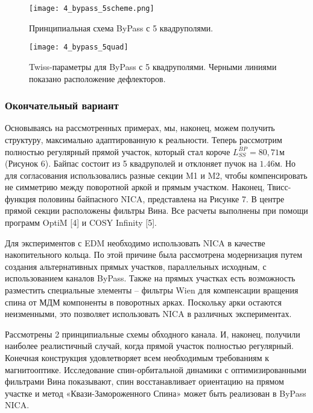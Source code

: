 \begin{figure}[!h]
  \centering
   \texttt{[image: 4\_bypass\_5scheme.png]}
   \caption{Принципиальная схема ByPass с 5 квадруполями.}
   \label{fig:4_bypass_5scheme}
\end{figure}

\begin{figure}[!h]
  \centering
   \texttt{[image: 4\_bypass\_5quad]}
   \caption{Twiss-параметры для ByPass с 5 квадруполями. Черными линиями показано расположение дефлекторов.}
   \label{fig:4_bypass_5quad}
\end{figure}

\subsubsection{Окончательный вариант}\label{sec:EDM/Wien_filter/ByPass/final}

Основываясь на рассмотренных примерах, мы, наконец, можем получить структуру, максимально адаптированную к реальности. Теперь рассмотрим полностью регулярный прямой участок, который стал короче $L_{SS}^{BP}=80,71 м$ (Рисунок 6). Байпас состоит из 5 квадруполей и отклоняет пучок на $1.46 м$. Но для согласования использовались разные секции M1 и M2, чтобы компенсировать не симметрию между поворотной аркой и прямым участком. Наконец, Твисс-функция половины байпасного NICA, представлена на Рисунке 7. В центре прямой секции расположены фильтры Вина. Все расчеты выполнены при помощи программ OptiM [4] и COSY Infinity [5].

\par Для экспериментов с EDM необходимо использовать NICA в качестве накопительного кольца. По этой причине была рассмотрена модернизация путем создания альтернативных прямых участков, параллельных исходным, с использованием каналов ByPass. Также на прямых участках есть возможность разместить специальные элементы – фильтры Wien для компенсации вращения спина от МДМ компоненты в поворотных арках. Поскольку арки остаются неизменными, это позволяет использовать NICA в различных экспериментах.
\par Рассмотрены 2 принципиальные схемы обходного канала. И, наконец, получили наиболее реалистичный случай, когда прямой участок полностью регулярный. Конечная конструкция удовлетворяет всем необходимым требованиям к магнитооптике. Исследование спин-орбитальной динамики с оптимизированными фильтрами Вина показывают, спин восстанавливает ориентацию на прямом участке и метод «Квази-Замороженного Спина» может быть реализован в ByPass NICA.


